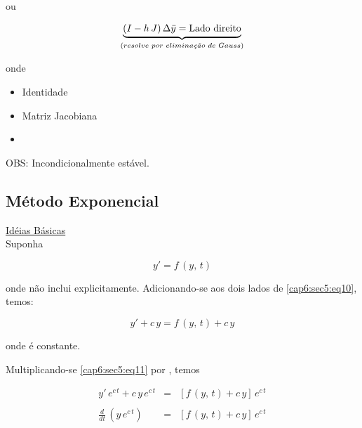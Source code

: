 ou

\begin{equation}
 \label{cap6:sec5:eq9}
 \underbrace{(I - h \, J) \, \Delta \bar{y} = \mbox{Lado direito}}_{(resolve \, \, por \, \, elimina\mbox{\textit{\scriptsize{çã}}}o \, \, de\, \, Gauss)}
\end{equation}

onde

\begin{itemize}

\item {} Identidade

\item {} Matriz Jacobiana

\item {}

\end{itemize}

OBS: Incondicionalmente estável.

\subsection{Método Exponencial}

\underline{Idéias Básicas}\\

Suponha

\begin{equation}
 \label{cap6:sec5:eq10}
 y' = f \, (y, \, t)
\end{equation}

onde  não inclui  explicitamente. Adicionando-se  aos dois lados de \ref{cap6:sec5:eq10}, temos:

\begin{equation}
 \label{cap6:sec5:eq11}
 y' + c \, y = f \, (y, \, t) + c \, y
\end{equation}

onde  é constante.

Multiplicando-se \ref{cap6:sec5:eq11} por , temos

\begin{eqnarray}
 \label{cap6:sec5:eq12}
 y' \, e^{c\,t} + c \, y \, e^{c\,t} & = & [f \, (y, \, t) + c \, y] \, e^{c\,t} \\
 \nonumber \\
 \label{cap6:sec5:eq13}
 \frac{d}{dt} \, (y \, e^{c\,t}) & = & [f \, (y, \, t) + c \, y] \, e^{c\,t}
\end{eqnarray}

